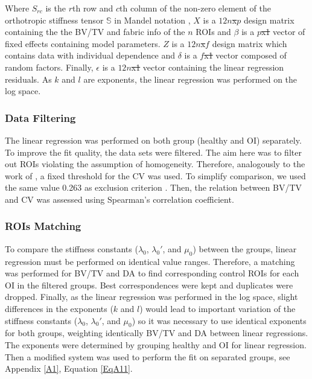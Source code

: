 \documentclass[a4paper,fleqn]{DC_ArtStyle}
\providecommand{\DIFadd}[1]{{\protect\color{blue}{#1}}} %
\providecommand{\DIFdel}[1]{{\protect\color{red}\sout{#1}}}                      %
\providecommand{\DIFaddbegin}{} %
\providecommand{\DIFaddend}{} %
\providecommand{\DIFdelbegin}{} %
\providecommand{\DIFdelend}{} %
\begin{document}
Where $S_{rc}$ is the $r$th row and $c$th column of the non-zero element of the orthotropic stiffness tensor $\mathbb{S}$ in Mandel notation \cite{MANDEL1965}, $X$ is a \DIFdelbegin \DIFdel{$12n$x$p$ }\DIFdelend \DIFaddbegin \DIFadd{$12 n \times p$ }\DIFaddend design matrix containing the the BV/TV and fabric info of the $n$ ROIs and $\beta$ is a \DIFdelbegin \DIFdel{$p$x1 }\DIFdelend \DIFaddbegin \DIFadd{$p \times 1$ }\DIFaddend vector of fixed effects containing model parameters. $Z$ is a \DIFdelbegin \DIFdel{$12n$x$f$ }\DIFdelend \DIFaddbegin \DIFadd{$12 n \times f$ }\DIFaddend design matrix which contains data with individual dependence and $\delta$ is a \DIFdelbegin \DIFdel{$f$x1 }\DIFdelend \DIFaddbegin \DIFadd{$f \times 1$ }\DIFaddend vector composed of random factors. Finally, $\epsilon$ is a \DIFdelbegin \DIFdel{$12n$x1 }\DIFdelend \DIFaddbegin \DIFadd{$12n \times 1$ }\DIFaddend vector containing the linear regression residuals. As $k$ and $l$ are exponents, the linear regression was performed on the log space.\\

\subsubsection{Data Filtering}
The linear regression was performed on both group (heal\-thy and OI) separately. To improve the fit quality, the data sets were filtered. The aim here was to filter out ROIs violating the assumption of homogeneity. Therefore, analogously to the work of \citeauthor{Panyasantisuk2015}\cite{Panyasantisuk2015}, a fixed threshold for the CV was used. To simplify comparison, we used the same value 0.263 as exclusion criterion \cite{Panyasantisuk2015}. Then, the relation between BV/TV and CV was assessed using Spearman's correlation coefficient. 

\subsubsection{ROIs Matching}
To compare the stiffness constants ($\lambda_0$, $\lambda_0'$, and $\mu_0$) between the groups, linear regression must be performed on identical value ranges. Therefore, a matching was performed for BV/TV and DA to find corresponding control ROIs for each OI in the filtered groups. Best correspondences were kept and duplicates were dropped. Finally, as the linear regression was performed in the log space, slight differences in the exponents ($k$ and $l$) would lead to important variation of the stiffness constants ($\lambda_0$, $\lambda_0'$, and $\mu_0$) so it was necessary to use identical exponents  for both groups, weighting identically BV/TV and DA between linear regressions. The exponents were determined by grouping healthy and OI for linear regression. Then a modified system was used to perform the fit on separated groups, see Appendix \ref{A1}, Equation \ref{EqA11}.\\
\end{document}
